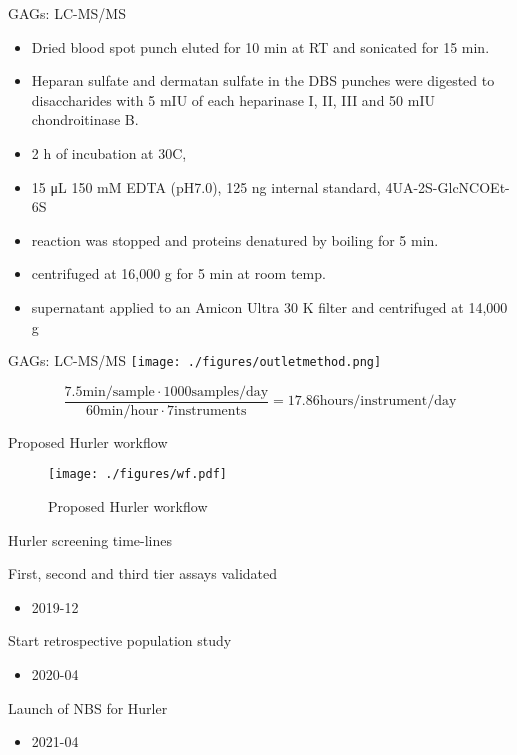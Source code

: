 \documentclass[presentation, smaller]{beamer}
\begin{document}
\begin{frame}[label={sec:orgheadline17}]{GAGs: LC-MS/MS}
\begin{itemize}
\item Dried blood spot punch eluted for 10 min at RT and sonicated for 15 min.
\item Heparan sulfate and dermatan sulfate in the DBS punches were
digested to disaccharides with 5 mIU of each heparinase I, II, III
and 50 mIU chondroitinase B.
\item 2 h of incubation at 30\degree C,
\item 15 μL 150 mM EDTA (pH7.0), 125 ng internal standard, 4UA-2S-GlcNCOEt-6S
\item reaction was stopped and proteins denatured by boiling for 5 min.
\item centrifuged at 16,000 g for 5 min at room temp.
\item supernatant applied to an Amicon Ultra 30 K filter and centrifuged at 14,000 g
\end{itemize}
\end{frame}

\begin{frame}[label={sec:orgheadline18}]{GAGs: LC-MS/MS}
\texttt{[image: ./figures/outletmethod.png]}


\[
\frac{7.5 \text{min/sample} \cdot 1000 \text{samples/day}}{60 \text{min/hour} \cdot 7 \text{instruments}}
= 17.86 \text{hours/instrument/day}
\]
\end{frame}

\begin{frame}[label={sec:orgheadline19}]{Proposed Hurler workflow}
\begin{figure}[htb]
\centering
\texttt{[image: ./figures/wf.pdf]}
\caption{\label{fig:wf}
Proposed Hurler workflow}
\end{figure}
\end{frame}

\begin{frame}[label={sec:orgheadline20}]{Hurler screening time-lines}
\begin{block}{First, second and third tier assays validated}
\begin{itemize}
\item 2019-12
\end{itemize}
\end{block}
\begin{block}{Start retrospective population study}
\begin{itemize}
\item 2020-04
\end{itemize}
\end{block}
\begin{block}{Launch of NBS for Hurler}
\begin{itemize}
\item 2021-04
\end{itemize}
\end{block}
\end{frame}
\end{document}
